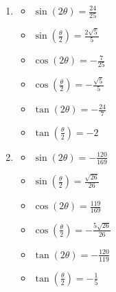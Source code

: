 \begin{enumerate}
\begin{multicols}{3}
\begin{itemize}

\item $\sin(2\theta) = \frac{24}{25}$
\item $\sin\left(\frac{\theta}{2}\right) = \frac{\sqrt{5}}{5}$
\item $\cos(2\theta) = -\frac{7}{25}$
\item $\cos\left(\frac{\theta}{2}\right) = \frac{2\sqrt{5}}{5}$
\item $\tan(2\theta)=-\frac{24}{7} $
\item $\tan\left(\frac{\theta}{2}\right) = \frac{1}{2}$

\end{itemize}

\end{multicols}



\item \begin{multicols}{3}

\begin{itemize}

\item $\sin(2\theta) = \frac{24}{25}$
\item $\sin\left(\frac{\theta}{2}\right) = \frac{2\sqrt{5}}{5}$
\item $\cos(2\theta) = -\frac{7}{25}$
\item $\cos\left(\frac{\theta}{2}\right) = -\frac{\sqrt{5}}{5}$
\item $\tan(2\theta)=-\frac{24}{7} $
\item $\tan\left(\frac{\theta}{2}\right) = -2$

\end{itemize}

\end{multicols}

\item \begin{multicols}{3}

\begin{itemize}

\item $\sin(2\theta) = -\frac{120}{169}$
\item $\sin\left(\frac{\theta}{2}\right) = \frac{\sqrt{26}}{26}$
\item $\cos(2\theta) = \frac{119}{169}$
\item $\cos\left(\frac{\theta}{2}\right) = -\frac{5\sqrt{26}}{26}$
\item $\tan(2\theta)=-\frac{120}{119}$
\item $\tan\left(\frac{\theta}{2}\right) = -\frac{1}{5}$


\end{itemize}
\end{multicols}
\end{enumerate}
